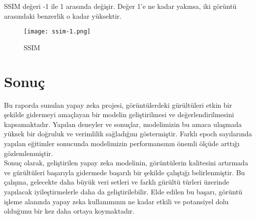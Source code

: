 \documentclass{article}
\begin{document}
\noindent SSIM değeri -1 ile 1 arasında değişir. Değer 1'e ne kadar yakınsa, iki görüntü arasındaki benzerlik o kadar yüksektir. \\[3pt]

\clearpage
\renewcommand{\figurename}{Şekil}
\begin{figure}[htbp]
     \centering
\texttt{[image: ssim-1.png]}\centering 
  \caption{SSIM\cite{SSIM}}
  \label{fig:resim_etiketi}
\end{figure}


\section{Sonuç}

\noindent Bu raporda sunulan yapay zeka projesi, görüntülerdeki gürültüleri etkin bir şekilde gidermeyi amaçlayan bir modelin geliştirilmesi ve değerlendirilmesini kapsamaktadır. Yapılan deneyler ve sonuçlar, modelimizin bu amaca ulaşmada yüksek bir doğruluk ve verimlilik sağladığını göstermiştir. Farklı epoch sayılarında yapılan eğitimler sonucunda modelimizin performansının önemli ölçüde arttığı gözlemlenmiştir. \\[3pt]

\noindent Sonuç olarak, geliştirilen yapay zeka modelinin, görüntülerin kalitesini artırmada ve gürültüleri başarıyla gidermede başarılı bir şekilde çalıştığı belirlenmiştir. Bu çalışma, gelecekte daha büyük veri setleri ve farklı gürültü türleri üzerinde yapılacak iyileştirmelerle daha da geliştirilebilir. Elde edilen bu başarı, görüntü işleme alanında yapay zeka kullanımının ne kadar etkili ve potansiyel dolu olduğunu bir kez daha ortaya koymaktadır.  \\[3pt]

\clearpage
\newpage



\end{document}

